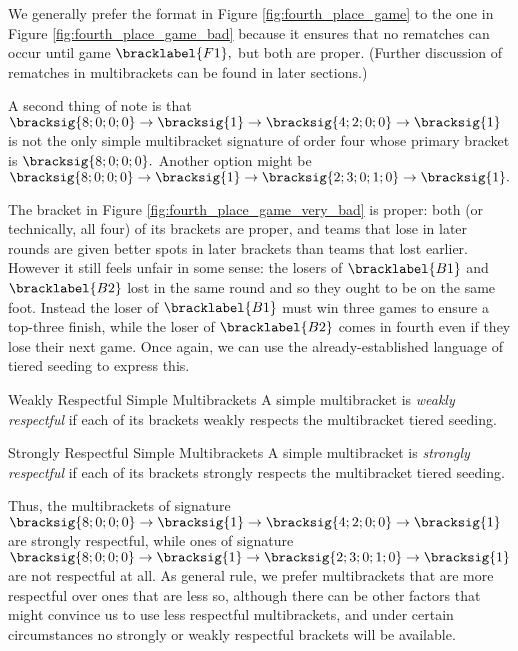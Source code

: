 {    We generally prefer the format in Figure \ref{fig:fourth_place_game} to the one in Figure \ref{fig:fourth_place_game_bad} because it ensures that no rematches can occur until game $\bracklabel{F1},$ but both are proper. (Further discussion of rematches in multibrackets can be found in later sections.)

    A second thing of note is that $\bracksig{8;0;0;0} \to \bracksig{1} \to \bracksig{4; 2; 0; 0} \to \bracksig{1}$ is not the only simple multibracket signature of order four whose primary bracket is $\bracksig{8;0;0;0}.$ Another option might be $\bracksig{8;0;0;0} \to \bracksig{1} \to \bracksig{2; 3; 0; 1; 0} \to \bracksig{1}.$


    The bracket in Figure \ref{fig:fourth_place_game_very_bad} is proper: both (or technically, all four) of its brackets are proper, and teams that lose in later rounds are given better spots in later brackets than teams that lost earlier. However it still feels unfair in some sense: the losers of $\bracklabel{B1}$ and $\bracklabel{B2}$ lost in the same round and so they ought to be on the same foot. Instead the loser of $\bracklabel{B1}$ must win three games to ensure a top-three finish, while the loser of $\bracklabel{B2}$ comes in fourth even if they lose their next game. Once again, we can use the already-established language of tiered seeding to express this.

    \begin{definition}{Weakly Respectful Simple Multibrackets}{}
        A simple multibracket is \textit{weakly respectful} if each of its brackets weakly respects the multibracket tiered seeding.
    \end{definition}

    \begin{definition}{Strongly Respectful Simple Multibrackets}{}
        A simple multibracket is \textit{strongly respectful} if each of its brackets strongly respects the multibracket tiered seeding.
    \end{definition}

    Thus, the multibrackets of signature $\bracksig{8;0;0;0} \to \bracksig{1} \to \bracksig{4; 2; 0; 0} \to \bracksig{1}$ are strongly respectful, while ones of signature $\bracksig{8;0;0;0} \to \bracksig{1} \to \bracksig{2; 3; 0; 1; 0} \to \bracksig{1}$ are not respectful at all. As general rule, we prefer multibrackets that are more respectful over ones that are less so, although there can be other factors that might convince us to use less respectful multibrackets, and under certain circumstances no strongly or weakly respectful brackets will be available.
}